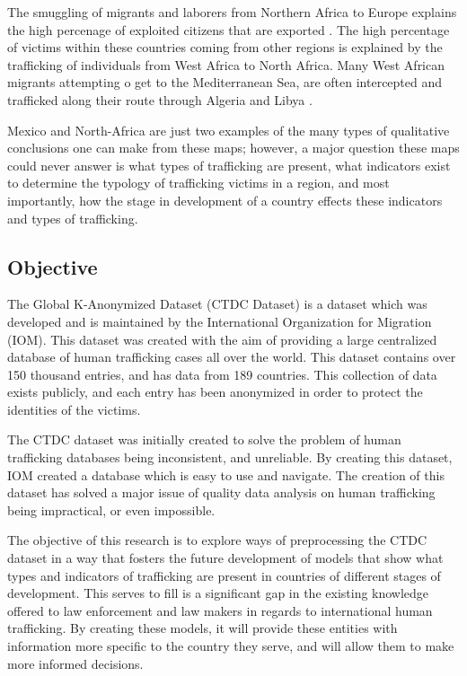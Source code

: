 \documentclass{article} %
\begin{document}
The smuggling of migrants and laborers from Northern Africa to Europe explains the high percenage of exploited citizens that are exported \parencite{AfricaExport}. The high percentage of victims within these countries coming from other regions is explained by the trafficking of individuals from West Africa to North Africa. Many West African migrants attempting o get to the Mediterranean Sea, are often intercepted and trafficked along their route through Algeria and Libya \parencite{AfricaImport}.

Mexico and North-Africa are just two examples of the many types of qualitative conclusions one can make from these maps; however, a major question these maps could never answer is what types of trafficking are present, what indicators exist to determine the typology of trafficking victims in a region, and most importantly, how the stage in development of a country effects these indicators and types of trafficking.







\subsection{Objective}

The Global K-Anonymized Dataset (CTDC Dataset) is a dataset which was developed and is maintained by the International Organization for Migration (IOM). This dataset was created with the aim of providing a large centralized database of human trafficking cases all over the world. This dataset contains over 150 thousand entries, and has data from 189 countries. This collection of data exists publicly, and each entry has been anonymized in order to protect the identities of the victims.

The CTDC dataset was initially created to solve the problem of human trafficking databases being inconsistent, and unreliable. By creating this dataset, IOM created a database which is easy to use and navigate. The creation of this dataset has solved a major issue of quality data analysis on human trafficking being impractical, or even impossible.

The objective of this research is to explore ways of preprocessing the CTDC dataset in a way that fosters the future development of models that show what types and indicators of trafficking are present in countries of different stages of development. This serves to fill is a significant gap in the existing knowledge offered to law enforcement and law makers in regards to international human trafficking. By creating these models, it will provide these entities with information more specific to the country they serve, and will allow them to make more informed decisions.
\end{document}

